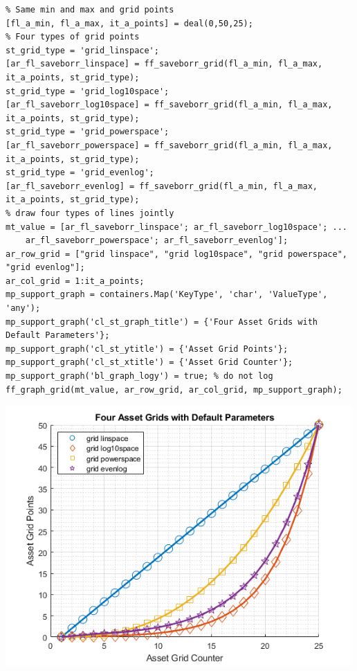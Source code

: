 \documentclass[
]{book}
\begin{document}
\begin{verbatim}
% Same min and max and grid points
[fl_a_min, fl_a_max, it_a_points] = deal(0,50,25);
% Four types of grid points
st_grid_type = 'grid_linspace';
[ar_fl_saveborr_linspace] = ff_saveborr_grid(fl_a_min, fl_a_max, it_a_points, st_grid_type);
st_grid_type = 'grid_log10space';
[ar_fl_saveborr_log10space] = ff_saveborr_grid(fl_a_min, fl_a_max, it_a_points, st_grid_type);
st_grid_type = 'grid_powerspace';
[ar_fl_saveborr_powerspace] = ff_saveborr_grid(fl_a_min, fl_a_max, it_a_points, st_grid_type);
st_grid_type = 'grid_evenlog';
[ar_fl_saveborr_evenlog] = ff_saveborr_grid(fl_a_min, fl_a_max, it_a_points, st_grid_type);
% draw four types of lines jointly
mt_value = [ar_fl_saveborr_linspace'; ar_fl_saveborr_log10space'; ...
    ar_fl_saveborr_powerspace'; ar_fl_saveborr_evenlog'];
ar_row_grid = ["grid linspace", "grid log10space", "grid powerspace", "grid evenlog"];
ar_col_grid = 1:it_a_points;
mp_support_graph = containers.Map('KeyType', 'char', 'ValueType', 'any');
mp_support_graph('cl_st_graph_title') = {'Four Asset Grids with Default Parameters'};
mp_support_graph('cl_st_ytitle') = {'Asset Grid Points'};
mp_support_graph('cl_st_xtitle') = {'Asset Grid Counter'};
mp_support_graph('bl_graph_logy') = true; % do not log
ff_graph_grid(mt_value, ar_row_grid, ar_col_grid, mp_support_graph);
\end{verbatim}

\includegraphics[width=5.20833in,height=\textheight]{img/fx_saveborr_grid_images/figure_0.png}
\end{document}
